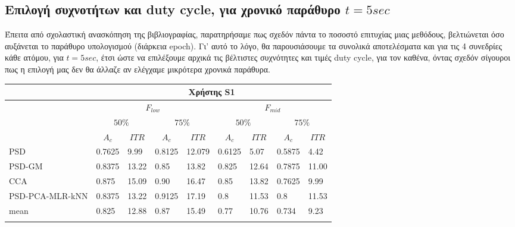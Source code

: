 \documentclass[11pt,a4paper,english,greek,twoside]{../Thesis}
\begin{document}
\subsection{Επιλογή συχνοτήτων και duty cycle, για χρονικό παράθυρο $t=5sec$}

\par Έπειτα από σχολαστική ανασκόπηση της βιβλιογραφίας, παρατηρήσαμε πως σχεδόν πάντα το ποσοστό επιτυχίας μιας μεθόδους, βελτιώνεται όσο αυξάνεται το παράθυρο υπολογισμού (διάρκεια epoch). Γι' αυτό το λόγο, θα παρουσιάσουμε τα συνολικά αποτελέσματα και για τις 4 συνεδρίες κάθε ατόμου, για $t=5sec$, έτσι ώστε να επιλέξουμε αρχικά τις βέλτιστες συχνότητες και τιμές duty cycle, για τον καθένα, όντας σχεδόν σίγουροι πως η επιλογή μας δεν θα άλλαζε αν ελέγχαμε μικρότερα χρονικά παράθυρα. 

\begin{table}[H]
    \centering
    \begin{tabular}{ |p{4cm}||p{1cm}|p{1cm}|p{1cm}|p{1cm}|p{1cm}|p{1cm}|p{1cm}|p{1cm}|}
        \hline
        \multicolumn{1}{|c||}{}& \multicolumn{8}{c|}{Χρήστης S1}\\
        \hline
        & \multicolumn{4}{c|}{$F_{low}$} & \multicolumn{4}{c|}{$F_{mid}$} \\
        \hline
        & \multicolumn{2}{c|}{$50\%$} & \multicolumn{2}{c|}{$75\%$} &
        \multicolumn{2}{c|}{$50\%$} & \multicolumn{2}{c|}{$75\%$} \\
        \hline
        & \multicolumn{1}{c|}{$A_c$} & \multicolumn{1}{c|}{$ITR$} &
         \multicolumn{1}{c|}{$A_c$} & \multicolumn{1}{c|}{$ITR$} &
          \multicolumn{1}{c|}{$A_c$} & \multicolumn{1}{c|}{$ITR$} &
           \multicolumn{1}{c|}{$A_c$} & \multicolumn{1}{c|}{$ITR$} \\
        \hline
        PSD             & 0.7625&   9.99&  0.8125& 12.079& 0.6125&  5.07& 0.5875&   4.42 \\
        PSD-GM          & 0.8375&  13.22&    0.85& 13.82&  0.825& 12.64& 0.7875&  11.00 \\
        CCA             &  0.875&  15.09&    0.90& 16.47&   0.85& 13.82& 0.7625&   9.99 \\
        PSD-PCA-MLR-kNN & 0.8375&  13.22&    0.9125& 17.19&     0.8& 11.53&    0.8&  11.53 \\
        \hline
        mean            &  0.825&  12.88&   0.87& 15.49&   0.77& 10.76& 0.734&   9.23 \\
        \hline
        \multicolumn{5}{c}{}\\

\end{tabular}
\end{table}
\end{document}
